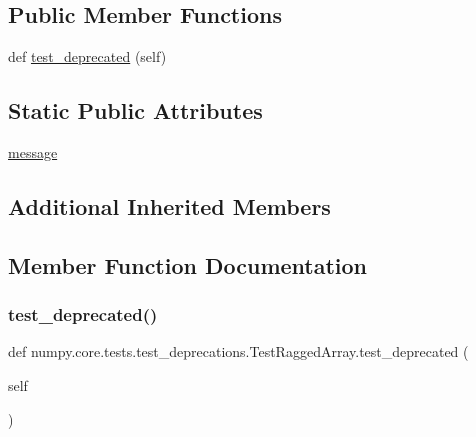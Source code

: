 \subsection*{Public Member Functions}
\begin{DoxyCompactItemize}
\item 
def \hyperlink{classnumpy_1_1core_1_1tests_1_1test__deprecations_1_1TestRaggedArray_aea9ca1a0c1468c56b58c1c175ac59caa}{test\+\_\+deprecated} (self)
\end{DoxyCompactItemize}
\subsection*{Static Public Attributes}
\begin{DoxyCompactItemize}
\item 
\hyperlink{classnumpy_1_1core_1_1tests_1_1test__deprecations_1_1TestRaggedArray_a47ccc7fdb66a404c2fee16e0f4c8f5d7}{message}
\end{DoxyCompactItemize}
\subsection*{Additional Inherited Members}


\subsection{Member Function Documentation}
\mbox{\label{classnumpy_1_1core_1_1tests_1_1test__deprecations_1_1TestRaggedArray_aea9ca1a0c1468c56b58c1c175ac59caa}} 
\subsubsection{\texorpdfstring{test\+\_\+deprecated()}{test\_deprecated()}}
{\footnotesize\ttfamily def numpy.\+core.\+tests.\+test\+\_\+deprecations.\+Test\+Ragged\+Array.\+test\+\_\+deprecated (\begin{DoxyParamCaption}\item[{}]{self }\end{DoxyParamCaption})}



